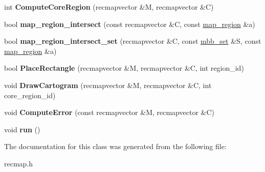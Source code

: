 \begin{DoxyCompactItemize}
\item 
\hypertarget{classcrecmap_1_1RecMap_a59c91bbd4b9d9c5057b082099f1bf89b}{int {\bfseries Compute\+Core\+Region} (recmapvector \&M, recmapvector \&C)}\label{classcrecmap_1_1RecMap_a59c91bbd4b9d9c5057b082099f1bf89b}

\item 
\hypertarget{classcrecmap_1_1RecMap_a18e096d369e0f4e4b2862af74367463d}{bool {\bfseries map\+\_\+region\+\_\+intersect} (const recmapvector \&C, const \hyperlink{structcrecmap_1_1map__region}{map\+\_\+region} \&a)}\label{classcrecmap_1_1RecMap_a18e096d369e0f4e4b2862af74367463d}

\item 
\hypertarget{classcrecmap_1_1RecMap_af5a5ca00e627d3f893734fb92eac2372}{bool {\bfseries map\+\_\+region\+\_\+intersect\+\_\+set} (recmapvector \&C, const \hyperlink{structcrecmap_1_1mbb__set}{mbb\+\_\+set} \&S, const \hyperlink{structcrecmap_1_1map__region}{map\+\_\+region} \&a)}\label{classcrecmap_1_1RecMap_af5a5ca00e627d3f893734fb92eac2372}

\item 
\hypertarget{classcrecmap_1_1RecMap_a9e8e3f05f71a8442fa7b259894f440e7}{bool {\bfseries Place\+Rectangle} (recmapvector \&M, recmapvector \&C, int region\+\_\+id)}\label{classcrecmap_1_1RecMap_a9e8e3f05f71a8442fa7b259894f440e7}

\item 
\hypertarget{classcrecmap_1_1RecMap_ac5e3a03d15aea4cd9ec532157b9b8268}{void {\bfseries Draw\+Cartogram} (recmapvector \&M, recmapvector \&C, int core\+\_\+region\+\_\+id)}\label{classcrecmap_1_1RecMap_ac5e3a03d15aea4cd9ec532157b9b8268}

\item 
\hypertarget{classcrecmap_1_1RecMap_a60be5dd2b1a501a9ef26724fae5d72ba}{void {\bfseries Compute\+Error} (const recmapvector \&M, recmapvector \&C)}\label{classcrecmap_1_1RecMap_a60be5dd2b1a501a9ef26724fae5d72ba}

\item 
\hypertarget{classcrecmap_1_1RecMap_a53f4cdc1bf45edbb3cf74bfa883d61ed}{void {\bfseries run} ()}\label{classcrecmap_1_1RecMap_a53f4cdc1bf45edbb3cf74bfa883d61ed}

\end{DoxyCompactItemize}


The documentation for this class was generated from the following file\+:\begin{DoxyCompactItemize}
\item 
recmap.\+h\end{DoxyCompactItemize}
